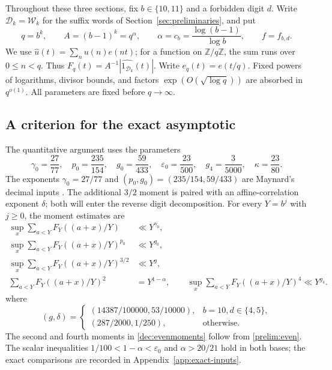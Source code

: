 \documentclass[11pt,a4paper]{article}
\theoremstyle{paperplain}
\numberwithin{equation}{section}
\begin{document}
Throughout these three sections, fix $b\in\{10,11\}$ and a forbidden
digit $d$. Write $\mathcal D_k=\mathcal W_k$ for the suffix words of
Section~\ref{sec:preliminaries}, and put
\[
 q=b^k,\qquad A=(b-1)^k=q^\alpha,\qquad
 \alpha=c_b=\frac{\log(b-1)}{\log b},\qquad f=f_{b,d}.
\]
We use $\widehat u(t)=\sum_nu(n)e(nt)$; for a function on
$\mathbb Z/q\mathbb Z$, the sum runs over $0\le n<q$.
Thus $F_q(t)=A^{-1}|\widehat{1_{\mathcal D_k}}(t)|$.
Write $e_q(t)=e(t/q)$. Fixed powers of logarithms, divisor bounds,
and factors $\exp(O(\sqrt{\log q}))$ are absorbed in $q^{o(1)}$.
All parameters are fixed before $q\to\infty$.

\subsection{A criterion for the exact asymptotic}
\label{dec:inputs}

The quantitative argument uses the parameters
\begin{equation}\label{dec:constants}
 \gamma_0=\frac{27}{77},\quad
 p_0=\frac{235}{154},\quad g_0=\frac{59}{433},\quad
 \varepsilon_0=\frac{23}{500},\quad g_4=\frac3{5000},\quad
 \kappa=\frac{23}{80}.
\end{equation}
The exponents $\gamma_0=27/77$ and
$(p_0,g_0)=(235/154,59/433)$ are Maynard's decimal inputs
\cite[Lemmas 10.3--10.4]{Maynard2019}.
The additional $3/2$ moment is paired with an affine-correlation
exponent $\delta$; both will enter the reverse digit decomposition.
For every $Y=b^j$ with $j\ge0$, the moment estimates are
\begin{align}
 \sup_x\sum_{a<Y}F_Y((a+x)/Y)&\ll Y^{\gamma_0},\label{dec:moment1}\\
 \sup_x\sum_{a<Y}F_Y((a+x)/Y)^{p_0}&\ll Y^{g_0},\label{dec:momentold}\\
 \sup_x\sum_{a<Y}F_Y((a+x)/Y)^{3/2}&\ll Y^{g},\label{dec:momentnew}\\
 \sum_{a<Y}F_Y((a+x)/Y)^2&=Y^{1-\alpha},\qquad
 \sup_x\sum_{a<Y}F_Y((a+x)/Y)^4\ll Y^{g_4}.
 \label{dec:evenmoments}
\end{align}
where
\begin{equation}\label{dec:groups}
 (g,\delta)=
 \begin{cases}
 (14387/100000, 53/10000),&b=10, d\in\{4,5\},\\
 (287/2000, 1/250),&\text{otherwise}.
 \end{cases}
\end{equation}
The second and fourth moments in \eqref{dec:evenmoments} follow from
\eqref{prelim:even}. The scalar inequalities
$1/100<1-\alpha<\varepsilon_0$ and $\alpha>20/21$ hold in both bases;
the exact comparisons are recorded in Appendix~\ref{app:exact-inputs}.
\end{document}
